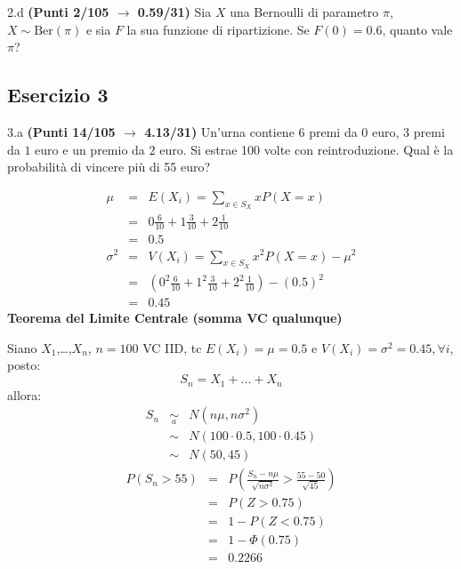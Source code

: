 \documentclass[
  11pt,
]{book}
\theoremstyle{mytheoremstyle}
\theoremstyle{mydefstyle}
\newenvironment{sol}
  {
  \begin{tcolorbox}[enhanced,breakable,arc=0.1mm,boxrule=1pt,colback=white,colframe=iblue,
  title=\bf \fontfamily{lmss}\selectfont \hspace{.5 cm} Soluzione,drop fuzzy shadow]

}{
\end{tcolorbox}
  }
\begin{document}
2.d \textbf{(Punti 2/105 \(\rightarrow\) 0.59/31)} Sia \(X\) una Bernoulli di parametro \(\pi\), \(X\sim\text{Ber}(\pi)\) e sia \(F\) la sua funzione di ripartizione. Se \(F(0)=0.6\), quanto vale \(\pi\)?

\subsection{Esercizio 3}\label{esercizio-3-37}

3.a \textbf{(Punti 14/105 \(\rightarrow\) 4.13/31)} Un'urna contiene 6 premi da \(\mbox{0}\) euro, 3 premi da \(\mbox{1}\) euro e un premio da \(\mbox{2}\) euro.
Si estrae 100 volte con reintroduzione.
Qual è la probabilità di vincere più di 55 euro?

\begin{sol}
\begin{eqnarray*} \mu &=& E(X_i) = \sum_{x\in S_X}x P(X=x)\\ 
 &=&  0  \frac { 6 }{ 10 }+ 1  \frac { 3 }{ 10 }+ 2  \frac { 1 }{ 10 } \\ 
            &=& 0.5 \\ 
 \sigma^2 &=& V(X_i) = \sum_{x\in S_X}x^2 P(X=x)-\mu^2\\ 
 &=&\left(  0  ^2\frac { 6 }{ 10 }+ 1  ^2\frac { 3 }{ 10 }+ 2  ^2\frac { 1 }{ 10 } \right)-( 0.5 )^2\\ 
            &=& 0.45 
\end{eqnarray*}
\textbf{Teorema del Limite Centrale (somma VC qualunque)}

Siano \(X_1\),\ldots,\(X_n\), \(n=100\) VC IID, tc \(E(X_i)=\mu=0.5\) e \(V(X_i)=\sigma^2=0.45,\forall i\), posto:
\[
      S_n = X_1 + ... + X_n
      \]
allora:\begin{eqnarray*}
  S_n & \mathop{\sim}\limits_{a}& N(n\mu,n\sigma^2) \\
     &\sim & N(100\cdot0.5,100\cdot0.45) \\
     &\sim & N(50,45) 
  \end{eqnarray*}\begin{eqnarray*}
      P( S_n   >   55 ) 
        &=& P\left(  \frac { S_n  -  n\mu }{ \sqrt{n\sigma^2} }  >  \frac { 55  -  50 }{\sqrt{ 45 }} \right)  \\
                 &=& P\left(  Z   >   0.75 \right) \\    &=& 1-P(Z< 0.75 )\\ 
                 &=&  1-\Phi( 0.75 ) \\ &=&  0.2266 
      \end{eqnarray*}

\end{sol}
\end{document}
